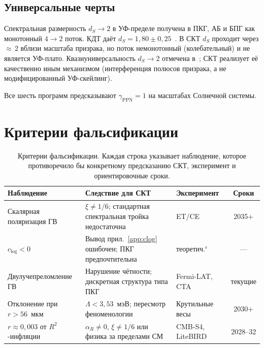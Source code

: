 \documentclass[12pt,a4paper]{article}
\theoremstyle{plain}
\theoremstyle{definition}
\theoremstyle{remark}
\begin{document}
\subsection{Универсальные черты}
\label{sec:universal}

Спектральная размерность $d_S \to 2$ в УФ-пределе получена в ПКГ,
АБ и БПГ как монотонный $4 \to 2$ поток. КДТ даёт
$d_S = 1{,}80 \pm 0{,}25$~\cite{AJL:2005}.
В СКТ $d_S$ проходит через ${\approx}\,2$ вблизи масштаба призрака,
но поток немонотонный (колебательный) и не является УФ-плато.
Квазиуниверсальность $d_S \to 2$ отмечена
в~\cite{Carlip:2017}; СКТ реализует её качественно иным механизмом
(интерференция полюсов призрака, а не модифицированный УФ-скейлинг).

Все шесть программ предсказывают $\gamma_{\mathrm{PPN}} = 1$ на
масштабах Солнечной системы.

\section{Критерии фальсификации}
\label{sec:falsification}

\begin{table}[ht]
\centering
\caption{Критерии фальсификации. Каждая строка указывает
наблюдение, которое противоречило бы конкретному предсказанию СКТ,
эксперимент и ориентировочные сроки.}
\label{tab:falsification}
\footnotesize
\setlength{\tabcolsep}{4pt}
\begin{tabular}{p{3.0cm}p{4.5cm}p{2.2cm}c}
\toprule
Наблюдение & Следствие для СКТ & Эксперимент & Сроки \\
\midrule
Скалярная поляризация ГВ &
  $\xi \neq 1/6$; стандартная спектральная тройка недостаточна &
  ET/CE & 2035+ \\[4pt]
$c_{\log} < 0$ &
  Вывод прил.~\ref{app:clog} ошибочен; ПКГ предпочтительна &
  теоретич.${}^e$ & --- \\[4pt]
Двулучепреломление ГВ &
  Нарушение чётности; дискретная структура типа ПКГ &
  Fermi-LAT, CTA & текущие \\[4pt]
Отклонение при $r > 56$~мкм &
  $\Lambda < 3{,}53$~мэВ; пересмотр феноменологии &
  Крутильные весы & 2030+ \\[4pt]
$r \approx 0{,}003$ от $R^2$-инфляции &
  $\alpha_R \neq 0$, $\xi \neq 1/6$ или физика за пределами СМ &
  CMB-S4, LiteBIRD & 2028--32 \\
\bottomrule
\end{tabular}

\smallskip{}
\normalsize
\end{table}
\end{document}

